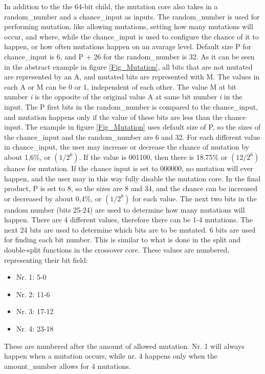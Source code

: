 In addition to the the 64-bit child, the mutation core also takes in a random\_number and a chance\_input as inputs. The random\_number is used for performing mutation, like allowing mutations, setting how many mutations will occur, and where, while the chance\_input is used to configure the chance of it to happen, or how often mutations happen on an avarage level. 
Default size P for chance\_input is 6, and P + 26 for the random\_number is 32. 
As it can be seen in the abstract example in figure \ref{Fig_Mutation}, all bits that are not mutated are represented by an A, and mutated bits are represented with M. 
The values in each A or M can be 0 or 1, independent of each other. 
The value M at bit number \emph{i} is the opposite of the original value A at same bit number \emph{i} in the input.
The P first bits in the random\_number is compared to the chance\_input, and mutation happens only if the value of these bits are less than the chance input. 
The example in figure \ref{Fig_Mutation} uses default size of P, so the sizes of the chance\_input and the random\_number are 6 and 32.
For each different value in chance\_input, the user may increase or decrease the chance of mutation by about 1,6\%, or $(1 / 2^6)$.
If the value is 001100, then there is 18.75\% or $(12 / 2^6)$ chance for mutation.
If the chance input is set to 000000, no mutation will ever happen, and the user may in this way fully disable the mutation core.
In the final product, P is set to 8, so the sizes are 8 and 34, and the chance can be increased or decreased by about 0,4\%, or $(1 / 2^8)$ for each value. 
The next two bits in the random number (bits 25-24) are used to determine how many mutations will happen. 
There are 4 different values, therefore there can be 1-4 mutations.
The next 24 bits are used to determine which bits are to be mutated. 
6 bits are used for finding each bit number. 
This is similar to what is done in the split and double-split functions in the crossover core. 
These values are numbered, representing their bit field:
\begin{itemize}
\item Nr. 1: 5-0
\item Nr. 2: 11-6
\item Nr. 3: 17-12
\item Nr. 4: 23-18
\end{itemize}
These are numbered after the amount of allowed mutation. 
Nr. 1 will always happen when a mutation occurs, while nr. 4 happens only when the amount\_number allows for 4 mutations.

